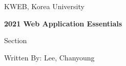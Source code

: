 \begin{titlepage}
    \centering
    \vspace*{35mm}
    \par\vspace{5mm}
    {\large KWEB, Korea University}
    \par\vspace{20mm}
    {\large\bfseries 2021 Web Application Essentials \par\huge \titlename{} Section}
    \par\vspace{30mm}
    {\large Written By: Lee, Chanyoung}
    \par\vspace{30mm}
    {\large\version}
\end{titlepage}
